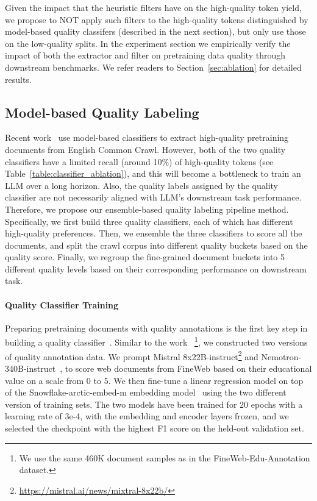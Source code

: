 \documentclass[11pt]{article}
\begin{document}
Given the impact that the heuristic filters have on the high-quality token yield, we propose to NOT apply such filters to the high-quality tokens distinguished by model-based quality classifers (described in the next section), but only use those on the low-quality splits. In the experiment section we empirically verify the impact of both the extractor and filter on pretraining data quality through downstream benchmarks. We refer readers to Section~\ref{sec:ablation} for detailed results.

\subsection{Model-based Quality Labeling} \label{sec:classifier}
Recent work~\citep{li2024datacomp,penedo2024fineweb} use model-based classifiers to extract high-quality pretraining documents from English Common Crawl. However, both of the two quality classifiers have a limited recall (around 10\%) of high-quality tokens (see Table~\ref{table:classifier_ablation}), and this will become a bottleneck to train an LLM over a long horizon. Also, the quality labels assigned by the quality classifier are not necessarily aligned with LLM's downstream task performance. Therefore, we propose our ensemble-based quality labeling pipeline method. Specifically, we first build three quality classifiers, each of which has different high-quality preferences. Then, we ensemble the three classifiers to score all the documents, and split the crawl corpus into different quality buckets based on the quality score. Finally, we regroup the fine-grained document buckets into 5 different quality levels based on their corresponding performance on downstream task. 

\paragraph{Quality Classifier Training}
Preparing pretraining documents with quality annotations is the first key step in building a quality classifier~\citep{dubey2024llama,abdin2024phi,yang2024qwen2}. Similar to the work ~\citep{penedo2024fineweb}\footnote{We use the same 460K document samples as in the FineWeb-Edu-Annotation dataset.}, we constructed two versions of quality annotation data. We prompt Mistral 8x22B-instruct\footnote{\url{https://mistral.ai/news/mixtral-8x22b/}} and Nemotron-340B-instruct~\citep{adler2024nemotron}, to score web documents from FineWeb based on their educational value on a scale from 0 to 5.  We then fine-tune a linear regression model on top of the Snowflake-arctic-embed-m embedding model~\citep{merrick2024arctic} using the two different version of training sets. The two models have been trained for 20 epochs with a learning rate of 3e-4, with the embedding and encoder layers frozen, and we selected the checkpoint with the highest F1 score on
the held-out validation set.
\end{document}
